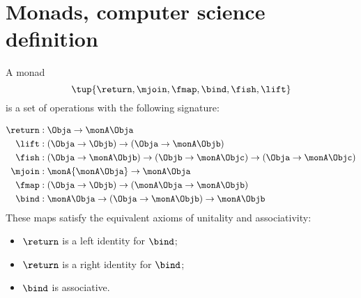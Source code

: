 

\section{Monads, computer science definition}
\label{sec:monads-CS}
 

\begin{definition}\label{def:monad-computer-science}
  A monad \begin{equation}
    \tup{\return,\mjoin,\fmap,\bind,\fish,\lift} 
  \end{equation}
  is a set of operations with the following signature:

  \begin{align*}
  \return & :\Obja\to\monA \Obja\\
  \lift & :(\Obja\to \Objb)\to( \Obja\to\monA \Objb)\\
  \fish & :(\Obja\to\monA \Objb)\to(\Objb\to\monA \Objc)\to(\Obja\to\monA \Objc)\\
  \mjoin & :\monA{\monA \Obja}\to\monA \Obja\\
  \fmap & :(\Obja\to \Objb)\to(\monA \Obja\to\monA \Objb)\\
  \bind & :\monA \Obja\to(\Obja\to\monA \Objb)\to\monA \Objb
  \end{align*}
  These maps satisfy the equivalent axioms of unitality and associativity:
  \begin{itemize}
  \item $\return$ is a left identity for $\bind$;
  \item $\return$ is a right identity for $\bind$;
  \item $\bind$ is associative.
  \end{itemize}
\end{definition}

